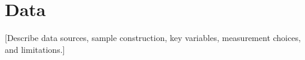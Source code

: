 \section{Data}

[Describe data sources, sample construction, key variables, measurement choices, and limitations.]
